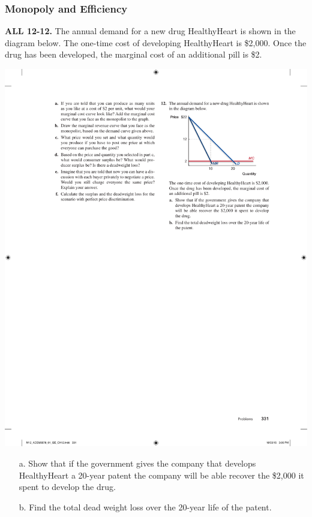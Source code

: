 \documentclass[12pt, xcolor=dvipsnames]{beamer}
\begin{document}
\begin{frame}
\frametitle{\bf Monopoly and Efficiency}
\small \textsf{\bfseries ALL 12-12.} 
The annual demand for a new drug HealthyHeart is shown in the diagram below. The one-time cost of developing HealthyHeart is \$2,000. Once the drug has been developed, the marginal cost of an additional pill is \$2.
\begin{center}
\includegraphics[width=.3\linewidth]{figures/12.pdf}
\end{center}
\begin{enumerate}\itemsep-0.5ex 
\item[a.] Show that if the government gives the company that develops HealthyHeart a 20-year patent the company will be able recover the \$2,000 it spent to develop the drug.
\item[b.] Find the total dead weight loss over the 20-year life of the patent. 
\end{enumerate}
\end{frame}
\end{document}
